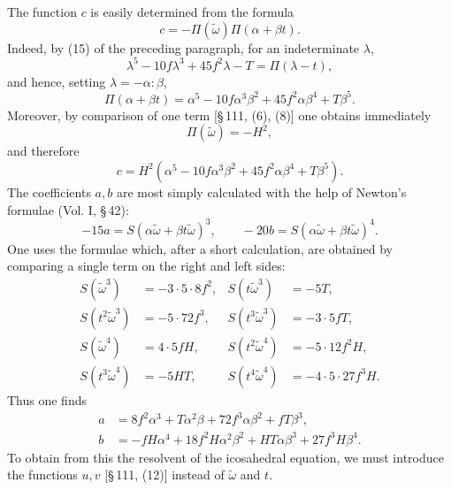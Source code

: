 \documentclass[11pt]{article}
\begin{document}
The function \(c\) is easily determined from the formula
\[
c=-\Pi(\tilde\omega)\Pi(\alpha+\beta t).
\]
Indeed, by (15) of the preceding paragraph, for an indeterminate \(\lambda\),
\[
\lambda^5-10f\lambda^3+45f^2\lambda-T=\Pi(\lambda-t),
\]
and hence, setting \(\lambda=-\alpha:\beta\),
\[
\Pi(\alpha+\beta t)=\alpha^5-10f\alpha^3\beta^2+45f^2\alpha\beta^4+T\beta^5.
\]
Moreover, by comparison of one term [\S\,111, (6), (8)] one obtains immediately
\[
\Pi(\tilde\omega)=-H^2,
\]
and therefore
\begin{equation}
c=H^2(\alpha^5-10f\alpha^3\beta^2+45f^2\alpha\beta^4+T\beta^5).
\tag{3}
\end{equation}
The coefficients \(a,b\) are most simply calculated with the help of Newton's formulae (Vol. I, \S\,42):
\[
-15a=S(\alpha\tilde\omega+\beta t\tilde\omega)^3,
\qquad
-20b=S(\alpha\tilde\omega+\beta t\tilde\omega)^4.
\]
One uses the formulae which, after a short calculation, are obtained by comparing a single term on the right and left sides:
\[
\begin{array}{rlrl}
S(\tilde\omega^3)&=-3\cdot5\cdot8f^2,&S(t\tilde\omega^3)&=-5T,\\
S(t^2\tilde\omega^3)&=-5\cdot72f^3,&S(t^3\tilde\omega^3)&=-3\cdot5fT,\\
S(\tilde\omega^4)&=4\cdot5fH,&S(t^2\tilde\omega^4)&=-5\cdot12f^2H,\\
S(t^3\tilde\omega^4)&=-5HT,&S(t^4\tilde\omega^4)&=-4\cdot5\cdot27f^3H.
\end{array}
\]
Thus one finds
\begin{align}
a&=8f^2\alpha^3+T\alpha^2\beta+72f^3\alpha\beta^2+fT\beta^3,
\tag{4}\\
b&=-fH\alpha^4+18f^2H\alpha^2\beta^2+HT\alpha\beta^3+27f^3H\beta^4.
\tag{5}
\end{align}
To obtain from this the resolvent of the icosahedral equation, we must introduce the functions \(u,v\) [\S\,111, (12)] instead of \(\tilde\omega\) and \(t\).
\end{document}
